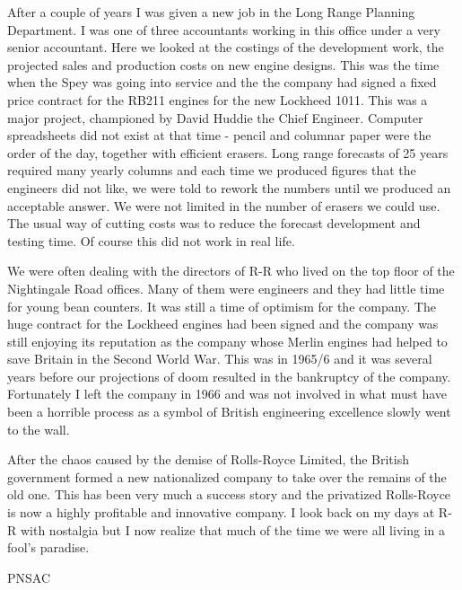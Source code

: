 After a couple of years I was given a new job in the Long Range
Planning Department. I was one of three accountants working in this
office under a very senior accountant. Here we looked at the costings
of the development work, the projected sales and production costs on
new engine designs. This was the time when the Spey was going into
service and the the company had signed a fixed price contract for the
RB211 engines for the new Lockheed 1011. This was a major project,
championed by David Huddie the Chief Engineer. Computer spreadsheets
did not exist at that time - pencil and columnar paper were the order
of the day, together with efficient erasers. Long range forecasts of
25 years required many yearly columns and each time we produced
figures that the engineers did not like, we were told to rework the
numbers until we produced an acceptable answer. We were not limited in
the number of erasers we could use. The usual way of cutting costs was
to reduce the forecast development and testing time. Of course this
did not work in real life.

We were often dealing with the directors of R-R who lived on the top
floor of the Nightingale Road offices. Many of them were engineers and
they had little time for young bean counters. It was still a time of
optimism for the company. The huge contract for the Lockheed engines
had been signed and the company was still enjoying its reputation as
the company whose Merlin engines had helped to save Britain in the
Second World War. This was in 1965/6 and it was several years before
our projections of doom resulted in the bankruptcy of the
company. Fortunately I left the company in 1966 and was not involved
in what must have been a horrible process as a symbol of British
engineering excellence slowly went to the wall.

After the chaos caused by the demise of Rolls-Royce Limited, the
British government formed a new nationalized company to take over the
remains of the old one. This has been very much a success story and
the privatized Rolls-Royce is now a highly profitable and innovative
company. I look back on my days at R-R with nostalgia but I now
realize that much of the time we were all living in a fool's paradise.

\begin{footnotesize}
    \raggedleft PNSAC\\
\end{footnotesize}



